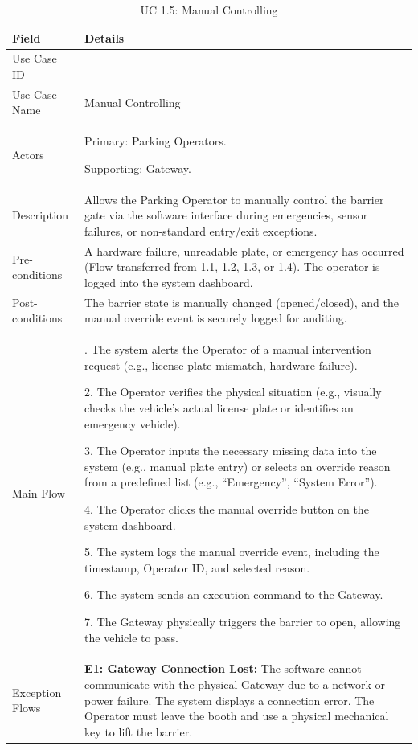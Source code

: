 \begin{table}[H]
\small
\renewcommand{\arraystretch}{1.4}
\begin{tabularx}{\textwidth}{|>{\raggedright\arraybackslash}p{3.5cm}|>{\RaggedRight\arraybackslash}X|}
\hline
\rowcolor{gray!20} \textbf{Field} & \textbf{Details} \\
\hline
Use Case ID & 1.5 \\
\hline
Use Case Name & Manual Controlling \\
\hline
Actors & Primary: Parking Operators. \par Supporting: Gateway. \\
\hline
Description & Allows the Parking Operator to manually control the barrier gate via the software interface during emergencies, sensor failures, or non-standard entry/exit exceptions. \\
\hline
Pre-conditions & A hardware failure, unreadable plate, or emergency has occurred (Flow transferred from 1.1, 1.2, 1.3, or 1.4). The operator is logged into the system dashboard. \\
\hline
Post-conditions & The barrier state is manually changed (opened/closed), and the manual override event is securely logged for auditing. \\
\hline
Main Flow & 
1. The system alerts the Operator of a manual intervention request (e.g., license plate mismatch, hardware failure). \par
2. The Operator verifies the physical situation (e.g., visually checks the vehicle's actual license plate or identifies an emergency vehicle). \par
3. The Operator inputs the necessary missing data into the system (e.g., manual plate entry) or selects an override reason from a predefined list (e.g., ``Emergency'', ``System Error''). \par
4. The Operator clicks the manual override button on the system dashboard. \par
5. The system logs the manual override event, including the timestamp, Operator ID, and selected reason. \par
6. The system sends an execution command to the Gateway. \par
7. The Gateway physically triggers the barrier to open, allowing the vehicle to pass. \\
\hline
Exception Flows & 
\textbf{E1: Gateway Connection Lost:} The software cannot communicate with the physical Gateway due to a network or power failure. The system displays a connection error. The Operator must leave the booth and use a physical mechanical key to lift the barrier. \\
\hline
\end{tabularx}
\caption{UC 1.5: Manual Controlling}
\label{tab:uc1.5}
\end{table}